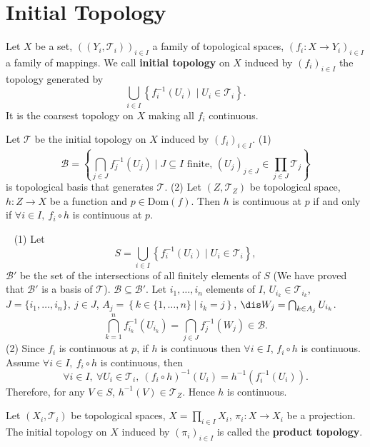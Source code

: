 \section{Initial Topology}
\begin{definitionenv}
    Let $X$ be a set, $\left((Y_i,\mathscr{T}_i)\right)_{i\in I}$ a family of topological spaces, $\left(f_i:X\longrightarrow Y_i\right)_{i\in I}$ a family of mappings. We call \textbf{initial topology} on $X$ induced by $\left(f_i\right)_{i\in I}$ the topology generated by 
    $$\bigcup_{i\in I}\left\{f^{-1}_i(U_i)\mid U_i\in \mathscr{T}_i\right\}.$$
    It is the coarsest topology on $X$ making all $f_i$ continuous.
\end{definitionenv}
\begin{propositionenv}
    Let $\mathscr{T}$ be the initial topology on $X$ induced by $\left(f_i\right)_{i\in I}$. 
    \newline
    (1) $$\mathcal{B}= \left\{ \bigcap_{j\in J}f^{-1}_j(U_j)\mid J\subseteq I \text{ finite, }\left(U_j\right)_{j\in J}\in \prod_{j\in J}\mathscr{T}_j\right\}$$
    is topological basis that generates $\mathscr{T}$.
    \newline
    (2) Let $(Z,\mathscr{T}_Z)$ be topological space, $h:Z\longrightarrow X$ be a function and $p\in \mathrm{Dom}(f)$. Then $h$ is continuous at $p$ if and only if $\forall i\in I,\ f_i\circ h$ is continuous at $p$.
\end{propositionenv}
\begin{proofenv}
    \ \newline
    (1) Let 
    $$S=\bigcup_{i\in I}\left\{f^{-1}_{i}\left(U_i\right)\mid U_i\in \mathscr{T}_i\right\},$$
    $\mathcal{B}'$ be the set of the intersections of all finitely elements of $S$ (We have proved that $\mathcal{B}'$ is a basis of $\mathscr{T}$). $\mathcal{B}\subseteq\mathcal{B}'$. Let $i_1,\dots, i_n$ elements of $I$, $U_{i_k}\in \mathscr{T}_{i_k}$, $J=\{i_1,\dots,i_n\},\ j\in J$, $A_j=\left\{k\in\{1,\dots,n\}\mid i_k=j\right\}$, $\dis W_j=\bigcap_{k\in A_j}U_{i_k}$.
    $$\bigcap_{k=1}^{n}f^{-1}_{i_k}\left(U_{i_k}\right)=\bigcap_{j\in J}f^{-1}_{j}\left(W_j\right)\in \mathcal{B}.$$
    (2) Since $f_i$ is continuous at $p$, if $h$ is continuous then $\forall i\in I$, $f_i\circ h$ is continuous. Assume $\forall i\in I,\ f_i\circ h$ is continuous, then 
    $$\forall i\in I,\ \forall U_i\in \mathscr{T}_i,\ \left(f_i\circ h\right)^{-1}\left(U_i\right)=h^{-1}\left(f_i^{-1}\left(U_i\right)\right).$$
    Therefore, for any $V\in S$, $h^{-1}(V)\in \mathscr{T}_Z.$ Hence $h$ is continuous.
\end{proofenv}
\begin{exampleenv}
    Let $(X_i,\mathscr{T}_i)$ be topological spaces, $X=\prod_{i\in I}X_i$, $\pi_i:X\longrightarrow X_i$ be a projection. The initial topology on $X$ induced by $(\pi_i)_{i\in I}$ is called the \textbf{product topology}.
\end{exampleenv}



